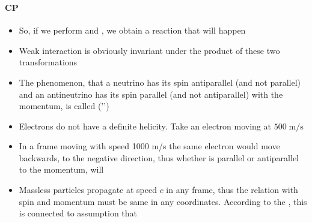 \begin{frame}
\frametitle{\texorpdfstring{\culine[\sectiontitleulinecolor]{\sectiontitle}}{\sectiontitle} }
\framesubtitle{CP}%

\semismall
\begin{itemize}
	\item So, if we perform  and , we obtain a reaction that will happen 
	
	\item Weak interaction is obviously invariant under the product of these two transformations  

\item The phenomenon, that a neutrino has its spin antiparallel (and not parallel)
and an antineutrino has its spin parallel (and not antiparallel) with
the momentum, is called  ('')

\item Electrons do not have a definite helicity. Take an electron moving at $500 \mathrm{\;m}/\mathrm{s}$

\item In a frame moving with speed 1000 m/s the same electron would move backwards,
to the negative direction, thus whether  is parallel or antiparallel to the
momentum, will 

\item Massless particles propagate at speed $c$ in any frame, thus the relation with spin and momentum must be same in any coordinates. According to the , this is connected to assumption that 
\end{itemize}

\endofslide 
\end{frame}

